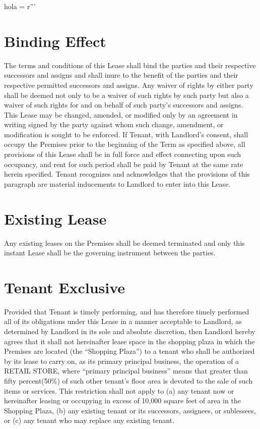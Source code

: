 hola = r'''\documentclass{article}
\newcommand{\use}{RETAIL STORE}
\begin{document}
\section{Binding Effect}
    The terms and conditions of this Lease shall bind the parties and their respective successors and assigns and shall inure to the benefit of the parties and their respective permitted successors and assigns. Any waiver of rights by either party shall be deemed not only to be a waiver of such rights by such party but also a waiver of such rights for and on behalf of such party's successors and assigns. This Lease may be changed, amended, or modified only by an agreement in writing signed by the party against whom such change, amendment, or modification is sought to be enforced. If Tenant, with Landlord's consent, shall occupy the Premises prior to the beginning of the Term as specified above, all provisions of this Lease shall be in full force and effect connecting upon such occupancy, and rent for such period shall be paid by Tenant at the same rate herein specified. Tenant recognizes and acknowledges that the provisions of this paragraph are material inducements to Landlord to enter into this Lease.


\section{Existing Lease}   
    Any existing leases on the Premises shall be deemed terminated and only this instant Lease shall be the governing instrument between the parties.

\section{Tenant Exclusive}
   Provided that Tenant is timely performing, and has therefore timely performed all of its obligations under this Lease in a manner acceptable to Landlord, as determined by Landlord in its sole and absolute discretion, then Landlord hereby agrees that it shall not hereinafter lease space in the shopping plaza in which the Premises are located (the ``Shopping Plaza'')  to a tenant who shall be authorized by its lease to carry on, as its primary principal business, the operation of a \use, where ``primary principal business'' means that greater than fifty  percent(50\%) of such other tenant's floor area is devoted to the sale of such items or services.  This restriction shall not apply to (a) any tenant now or hereinafter leasing or occupying in excess of 10,000 square feet of area in the Shopping Plaza, (b) any existing tenant or its successors, assignees, or sublessees, or (c) any tenant who may replace any existing tenant.
\end{document}
